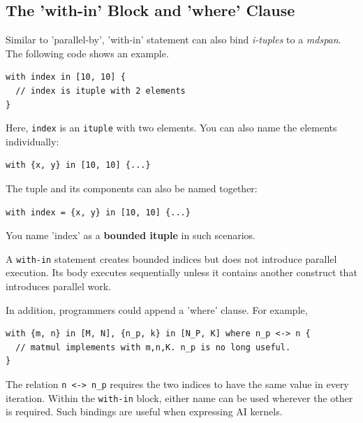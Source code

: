 \subsection*{The 'with-in' Block and 'where' Clause}

Similar to 'parallel-by', 'with-in' statement can also bind \emph{i-tuples} to a \emph{mdspan}. The following code shows an example.

\begin{lstlisting}[language=croqtile,caption={Indexing a with-in block}]
with index in [10, 10] {
  // index is ituple with 2 elements
}
\end{lstlisting}

Here, \texttt{index} is an \texttt{ituple} with two elements. You can also name the elements individually:

\begin{lstlisting}[language=croqtile,caption={A tuple of indices}]
with {x, y} in [10, 10] {...}
\end{lstlisting}

The tuple and its components can also be named together:

\begin{lstlisting}[language=croqtile,caption={Indices derived from a tuple}]
with index = {x, y} in [10, 10] {...}
\end{lstlisting}

You name 'index' as a \textbf{bounded ituple} in such scenarios.

A \texttt{with-in} statement creates bounded indices but does not introduce parallel execution. Its body executes sequentially unless it contains another construct that introduces parallel work.

In addition, programmers could append a 'where' clause. For example,

\begin{lstlisting}[language=croqtile,caption={Nested bounded groups}]
with {m, n} in [M, N], {n_p, k} in [N_P, K] where n_p <-> n {
  // matmul implements with m,n,K. n_p is no long useful.
}
\end{lstlisting}

The relation \texttt{n \textless{}-\allowbreak{}\textgreater{} n\_\allowbreak{}p} requires the two indices to have the same value in every iteration. Within the \texttt{with-in} block, either name can be used wherever the other is required. Such bindings are useful when expressing AI kernels.
